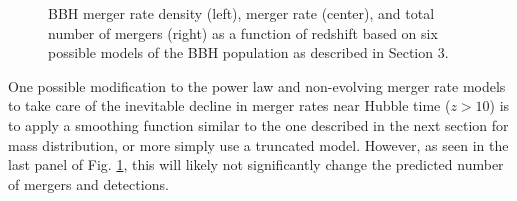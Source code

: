 \documentclass{article}
\begin{document}
\begin{figure}[!htb]
    \caption{\label{fig:mergerrate} BBH merger rate density (left), merger rate (center), and total number of mergers (right) as a function of redshift based on six possible models of the BBH population as described in Section 3.}
\end{figure}

One possible modification to the power law and non-evolving merger rate models to take care of the inevitable decline in merger rates near Hubble time ($z > 10$) is to apply a smoothing function similar to the one described in the next section for mass distribution, or more simply use a truncated model. However, as seen in the last panel of Fig. \ref{fig:mergerrate}, this will likely not significantly change the predicted number of mergers and detections.
\end{document}
